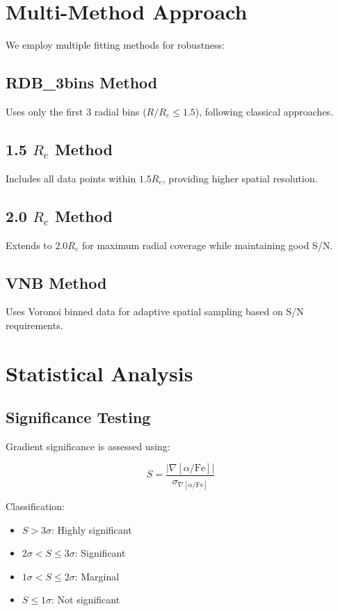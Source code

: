 \documentclass[11pt,a4paper]{article}
\begin{document}
\section{Multi-Method Approach}

We employ multiple fitting methods for robustness:

\subsection{RDB\_3bins Method}
Uses only the first 3 radial bins ($R/R_e \leq 1.5$), following classical approaches.

\subsection{1.5 $R_e$ Method}
Includes all data points within $1.5 R_e$, providing higher spatial resolution.

\subsection{2.0 $R_e$ Method}
Extends to $2.0 R_e$ for maximum radial coverage while maintaining good S/N.

\subsection{VNB Method}
Uses Voronoi binned data for adaptive spatial sampling based on S/N requirements.

\section{Statistical Analysis}

\subsection{Significance Testing}

Gradient significance is assessed using:

\begin{equation}
S = \frac{|\nabla[\alpha/\text{Fe}]|}{\sigma_{\nabla[\alpha/\text{Fe}]}}
\end{equation}

Classification:
\begin{itemize}
\item $S > 3\sigma$: Highly significant
\item $2\sigma < S \leq 3\sigma$: Significant  
\item $1\sigma < S \leq 2\sigma$: Marginal
\item $S \leq 1\sigma$: Not significant
\end{itemize}
\end{document}
